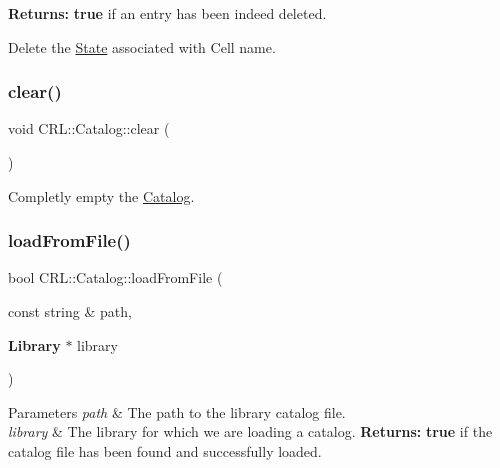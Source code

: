 {\bfseries Returns\+:} {\bfseries true} if an entry has been indeed deleted.

Delete the \hyperlink{classCRL_1_1Catalog_1_1State}{State} associated with Cell {\ttfamily name}. \mbox{\label{classCRL_1_1Catalog_aa40bdbaf5b64f56b085bfce72dc89fe6}} 
\subsubsection{\texorpdfstring{clear()}{clear()}}
{\footnotesize\ttfamily void C\+R\+L\+::\+Catalog\+::clear (\begin{DoxyParamCaption}{ }\end{DoxyParamCaption})}

Completly empty the \hyperlink{classCRL_1_1Catalog}{Catalog}. \mbox{\label{classCRL_1_1Catalog_a02ae9d3636235db933a29c08329c5778}} 
\subsubsection{\texorpdfstring{load\+From\+File()}{loadFromFile()}}
{\footnotesize\ttfamily bool C\+R\+L\+::\+Catalog\+::load\+From\+File (\begin{DoxyParamCaption}\item[{const string \&}]{path,  }\item[{\textbf{ Library} $\ast$}]{library }\end{DoxyParamCaption})}


\begin{DoxyParams}{Parameters}
{\em path} & The path to the library catalog file. \\
\hline
{\em library} & The library for which we are loading a catalog. {\bfseries Returns\+:} {\bfseries true} if the catalog file has been found and successfully loaded. \\
\hline
\end{DoxyParams}
\mbox{\label{classCRL_1_1Catalog_a3e326d2515c01af4fc75e421a3b61a81}} 
